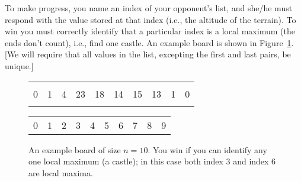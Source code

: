 \documentclass[10pt]{article}
\begin{document}
To make progress, you name an index of your opponent's list, and she/he must respond with the value stored at that index (i.e., the altitude of the terrain). To win you must correctly identify that a particular index is a local maximum (the ends don't count), i.e., find one castle. An example board is shown in Figure~\ref{fig:board}. [We will require that all values in the list, excepting the first and last pairs, be unique.]

\begin{figure}[h]
    \centering
        \begin{tabularx}{0.7\textwidth}{ | *{10}{Y|} }
                \hline
                  &   &   &    &    &    &    &    &   & \\
                0 & 1 & 4 & 23 & 18 & 14 & 15 & 13 & 1 & 0\\
                  &   &   &    &    &    &    &    &   & \\
                \hline
        \end{tabularx}
        {\small\begin{tabularx}{0.7\textwidth}{  *{10}{Y} }
                0 & 1 & 2 & 3 & 4 & 5 & 6 & 7 & 8 & 9
        \end{tabularx}}

    \caption{An example board of size $n=10$. You win if you can identify any one local maximum (a castle); in this case both index $3$ and index $6$ are local maxima.}
    \label{fig:board}
\end{figure}

\pagebreak
\end{document}
